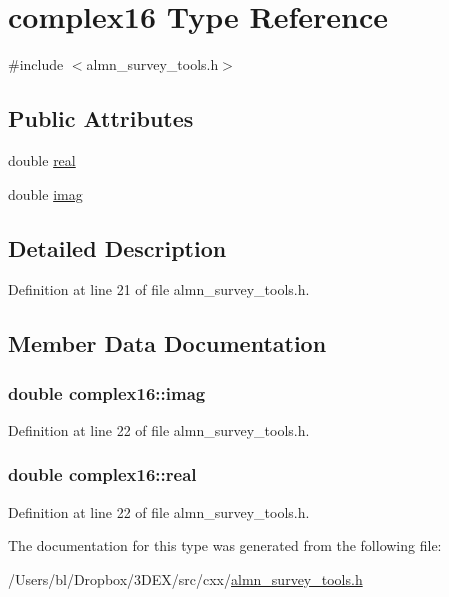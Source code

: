 \hypertarget{typecomplex16}{
\section{complex16 Type Reference}
\label{typecomplex16}
}


{\ttfamily \#include $<$almn\_\-survey\_\-tools.h$>$}

\subsection*{Public Attributes}
\begin{DoxyCompactItemize}
\item 
double \hyperlink{typecomplex16_a7ac8ed51dd367b881aa7a661add1519c}{real}
\item 
double \hyperlink{typecomplex16_a960ffac445c141ca3669365c478da193}{imag}
\end{DoxyCompactItemize}


\subsection{Detailed Description}


Definition at line 21 of file almn\_\-survey\_\-tools.h.



\subsection{Member Data Documentation}
\hypertarget{typecomplex16_a960ffac445c141ca3669365c478da193}{
\subsubsection[{imag}]{\setlength{\rightskip}{0pt plus 5cm}double {\bf complex16::imag}}}
\label{typecomplex16_a960ffac445c141ca3669365c478da193}


Definition at line 22 of file almn\_\-survey\_\-tools.h.

\hypertarget{typecomplex16_a7ac8ed51dd367b881aa7a661add1519c}{
\subsubsection[{real}]{\setlength{\rightskip}{0pt plus 5cm}double {\bf complex16::real}}}
\label{typecomplex16_a7ac8ed51dd367b881aa7a661add1519c}


Definition at line 22 of file almn\_\-survey\_\-tools.h.



The documentation for this type was generated from the following file:\begin{DoxyCompactItemize}
\item 
/Users/bl/Dropbox/3DEX/src/cxx/\hyperlink{almn__survey__tools_8h}{almn\_\-survey\_\-tools.h}\end{DoxyCompactItemize}

